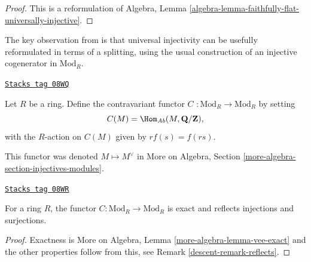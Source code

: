 \begin{proof}
This is a reformulation of Algebra, Lemma
\ref{algebra-lemma-faithfully-flat-universally-injective}.
\end{proof}

The key observation from \cite{mesablishvili1} is that universal injectivity
can be usefully reformulated in terms of a splitting, using the usual
construction of an injective cogenerator in $\text{Mod}_R$.

\begin{definition}[C]
\label{descent-definition-C}
\href{https://stacks.math.columbia.edu/tag/08WQ}{\texttt{Stacks tag 08WQ}}

Let $R$ be a ring. Define the contravariant functor
{\it $C$} $ : \text{Mod}_R \to \text{Mod}_R$ by setting
$$
C(M) = \Hom_{\textit{Ab}}(M, \mathbf{Q}/\mathbf{Z}),
$$
with the $R$-action on $C(M)$ given by $rf(s) = f(rs)$.
\end{definition}

This functor was denoted $M \mapsto M^\vee$ in
More on Algebra, Section \ref{more-algebra-section-injectives-modules}.

\begin{lemma}[C is faithful]
\label{descent-lemma-C-is-faithful}
\href{https://stacks.math.columbia.edu/tag/08WR}{\texttt{Stacks tag 08WR}}

For a ring $R$, the functor $C : \text{Mod}_R \to \text{Mod}_R$ is
exact and reflects injections and surjections.
\end{lemma}

\begin{proof}

Exactness is More on Algebra, Lemma \ref{more-algebra-lemma-vee-exact}
and the other properties follow from this, see
Remark \ref{descent-remark-reflects}.
\end{proof}

